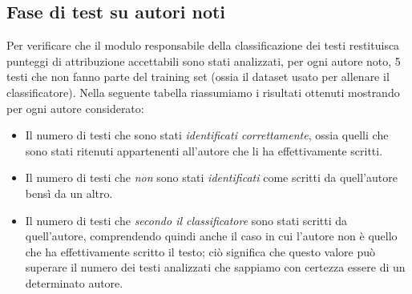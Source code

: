\documentclass[titlepage]{article}
\begin{document}
\subsection{Fase di test su autori noti}
Per verificare che il modulo responsabile della classificazione dei testi restituisca punteggi di attribuzione accettabili sono stati analizzati, per ogni autore noto, 5 testi che non fanno parte del training set (ossia il dataset usato per allenare il classificatore). Nella seguente tabella riassumiamo i risultati ottenuti mostrando per ogni autore considerato:
\begin{itemize}
    \item Il numero di testi che sono stati \textit{identificati correttamente}, ossia quelli che sono stati ritenuti appartenenti all'autore che li ha effettivamente scritti.
    \item Il numero di testi che \textit{non} sono stati \textit{identificati} come scritti da quell'autore bensì da un altro.
    \item Il numero di testi che \textit{secondo il classificatore} sono stati scritti da quell'autore, comprendendo quindi anche il caso in cui l'autore non è quello che ha effettivamente scritto il testo; ciò significa che questo valore può superare il numero dei testi analizzati che sappiamo con certezza essere di un determinato autore.
\end{itemize}
\end{document}
